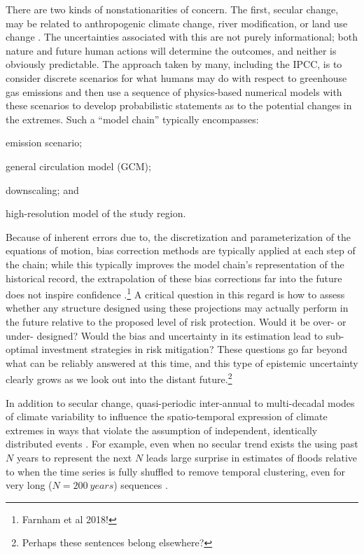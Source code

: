 \documentclass[12pt]{article}
\begin{document}
There are two kinds of nonstationarities of concern.
The first, secular change, may be related to anthropogenic climate change, river modification, or land use change \citep{Merz2014}.
The uncertainties associated with this are not purely informational; both nature and future human actions will determine the outcomes, and neither is obviously predictable.
The approach taken by many, including the IPCC, is to consider discrete scenarios for what humans may do with respect to greenhouse gas emissions and then use a sequence of physics-based numerical models with these scenarios to develop probabilistic statements as to the potential changes in the extremes.
Such a ``model chain'' typically encompasses:
\begin{enumerate*}[label= (\roman*) ]
  \item emission scenario;
  \item general circulation model (GCM);
  \item downscaling; and
  \item high-resolution model of the study region.
\end{enumerate*}
Because of inherent errors due to, \eg{} the discretization and parameterization of the equations of motion, bias correction methods are typically applied at each step of the chain; while this typically improves the model chain's representation of the historical record, the extrapolation of these bias corrections far into the future does not inspire confidence \citep{Dankers2009,Ott2013,Merz2014,Dittes2017}.\footnote{Farnham et al 2018!}
A critical question in this regard is how to assess whether any structure designed using these projections may actually perform in the future relative to the proposed level of risk protection.
Would it be over- or under- designed?
Would the bias and uncertainty in its estimation lead to sub-optimal investment strategies in risk mitigation?
These questions go far beyond what can be reliably answered at this time, and this type of epistemic uncertainty clearly grows as we look out into the distant future.\footnote{Perhaps these sentences belong elsewhere?}

In addition to secular change, quasi-periodic inter-annual to multi-decadal modes of climate variability \citep[see][]{Hannachi2017} to influence the spatio-temporal expression of climate extremes in ways that violate the assumption of independent, identically distributed events \citep[see][]{Merz2014,Serinaldi2015,Hoskins2015}.
For example, even when no secular trend exists the using past $N$ years to represent the next $N$ leads large surprise in estimates of floods relative to when the time series is fully shuffled to remove temporal clustering, even for very long ($N=\SI{200}{years}$) sequences \citep{Jain2001}.
\end{document}
